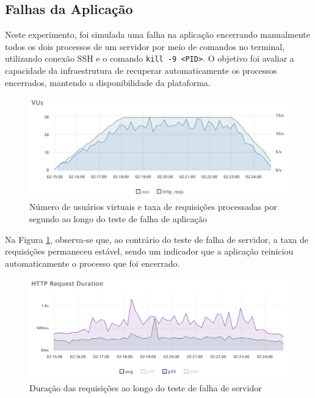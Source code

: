 \subsection{Falhas da Aplicação}

Neste experimento, foi simulada uma falha na aplicação encerrando manualmente todos os dois processos de um servidor por meio de comandos no terminal, utilizando conexão SSH e o comando \texttt{kill -9 <PID>}. O objetivo foi avaliar a capacidade da infraestrutura de recuperar automaticamente os processos encerrados, mantendo a disponibilidade da plataforma.

\begin{figure}[H]
    \centering
    \includegraphics[width=1\textwidth]{assets/process-failing-test/vus-and-reqs.png}
    \caption{Número de usuários virtuais e taxa de requisições processadas por segundo ao longo do teste de falha de aplicação}
    \label{fig:process-failing-vus-and-reqs}
\end{figure}

Na Figura \ref{fig:process-failing-vus-and-reqs}, observa-se que, ao contrário do teste de falha de servidor, a taxa de requisições permaneceu estável, sendo um indicador que a aplicação reiniciou automaticamente o processo que foi encerrado.

\begin{figure}[H]
    \centering
    \includegraphics[width=1\textwidth]{assets/process-failing-test/req-duration.png}
    \caption{Duração das requisições ao longo do teste de falha de servidor}
    \label{fig:process-failing-req-duration}
\end{figure}

